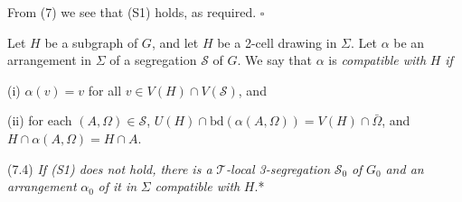 From (7) we see that (S1) holds, as required. $\square$

Let $H$ be a subgraph of $G$, and let $H$ be a 2-cell drawing in $\Sigma$. Let $\alpha$ be an arrangement in $\Sigma$ of a segregation $\mathcal{S}$ of $G$. We say that $\alpha$ is \textit{compatible with} $H$ \textit{if}

\hspace*{12pt}(i) $\alpha(v) = v$ for all $v \in V(H) \cap V(\mathcal{S})$, and

\hspace*{12pt}(ii) for each $(A, \Omega) \in \mathcal{S}$, $U(H) \cap \text{bd}(\alpha(A, \Omega)) = V(H) \cap \bar{\Omega}$, and $H \cap \alpha(A, \Omega) = H \cap A$.

\stmt
(7.4) \textit{If (S1) does not hold, there is a} $\mathcal{T}$\textit{-local 3-segregation} $\mathcal{S}_0$ \textit{of} $G_0$ \textit{and an arrangement} $\alpha_0$ \textit{of it in} $\Sigma$ \textit{compatible with} $H$.*
